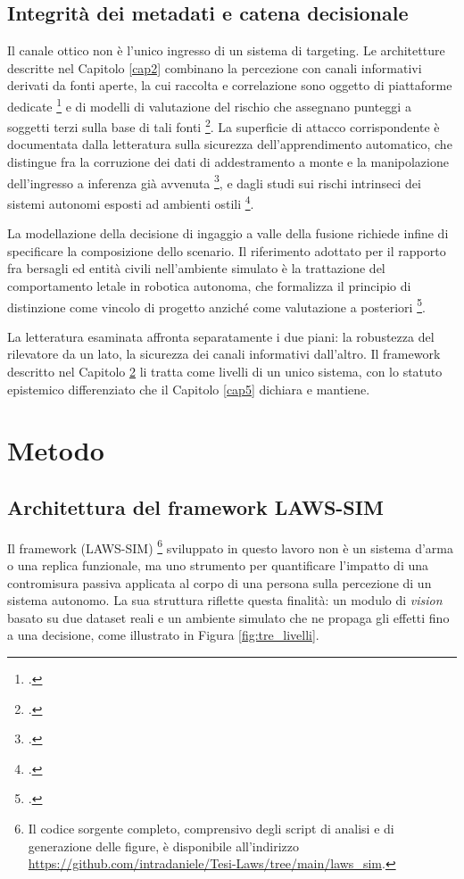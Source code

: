 \documentclass[a4paper,12pt]{report}
\begin{document}
\section{Integrità dei metadati e catena decisionale}
\label{sec:sota_metadati}

Il canale ottico non è l'unico ingresso di un sistema di targeting. Le
architetture descritte nel Capitolo \ref{cap2} combinano la percezione con
canali informativi derivati da fonti aperte, la cui raccolta e correlazione sono
oggetto di piattaforme dedicate \footcite{gonzalez_2021_etip} e di modelli di
valutazione del rischio che assegnano punteggi a soggetti terzi sulla base di
tali fonti \footcite{asili_2025_gentprm}. La superficie di attacco corrispondente
è documentata dalla letteratura sulla sicurezza dell'apprendimento automatico,
che distingue fra la corruzione dei dati di addestramento a monte e la
manipolazione dell'ingresso a inferenza già avvenuta \footcite{cina_2023_poisoning},
e dagli studi sui rischi intrinseci dei sistemi autonomi esposti ad ambienti
ostili \footcite{podar_2025}.

La modellazione della decisione di ingaggio a valle della fusione richiede infine
di specificare la composizione dello scenario. Il riferimento adottato per il
rapporto fra bersagli ed entità civili nell'ambiente simulato è la trattazione
del comportamento letale in robotica autonoma, che formalizza il principio di
distinzione come vincolo di progetto anziché come valutazione a posteriori
\footcite{arkin_2009}.

La letteratura esaminata affronta separatamente i due piani: la robustezza del
rilevatore da un lato, la sicurezza dei canali informativi dall'altro. Il
framework descritto nel Capitolo \ref{cap4} li tratta come livelli di un unico
sistema, con lo statuto epistemico differenziato che il Capitolo \ref{cap5}
dichiara e mantiene.


\chapter{Metodo}
\label{cap4}

\section{Architettura del framework LAWS-SIM}
\label{sec:laws_sim}

Il framework (LAWS-SIM) \footnote{Il codice sorgente completo, comprensivo degli
script di analisi e di generazione delle figure, è disponibile
all'indirizzo \url{https://github.com/intradaniele/Tesi-Laws/tree/main/laws_sim}.}
sviluppato in questo lavoro non è un sistema d'arma o una replica funzionale, ma
uno strumento per quantificare l'impatto di una contromisura passiva applicata al
corpo di una persona sulla percezione di un sistema autonomo. La sua struttura
riflette questa finalità: un modulo di \textit{vision} basato su due dataset
reali e un ambiente simulato che ne propaga gli effetti fino a una decisione,
come illustrato in Figura \ref{fig:tre_livelli}.
\end{document}
